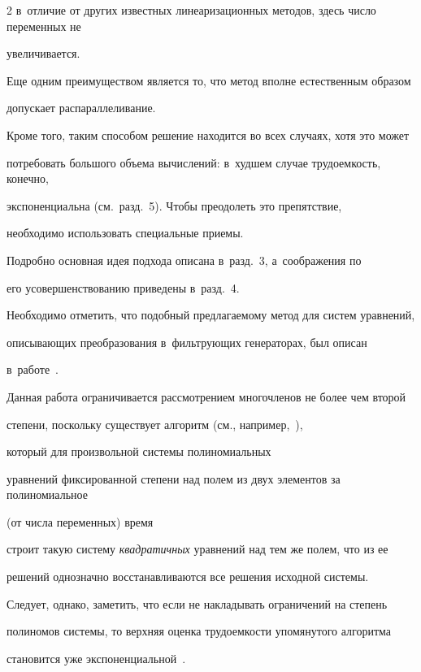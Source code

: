 \begin{multicols}{2}
в~отличие от других известных линеаризационных методов, здесь число переменных не 


увеличивается.


Еще одним преимуществом является то, что метод вполне естественным образом 


допускает распараллеливание.


Кроме того, таким способом решение находится во всех случаях, хотя это может 


потребовать большого объема вычислений: в~худшем случае трудоемкость, конечно, 


экспоненциальна (см.\ разд.~5). Чтобы преодолеть это препятствие, 


необходимо использовать специальные приемы.


Подробно основная идея подхода описана в~разд.~3, а~соображения по 


его усовершенствованию приведены в~разд.~4.


Необходимо отметить, что подобный пред\-ла\-га\-емо\-му метод для систем уравнений, 


описывающих преобразования в~фильтрующих генераторах, был описан 


в~работе~\cite{Log2008}.





Данная работа ограничивается рассмотрением многочленов не более чем второй 


степени, поскольку существует алгоритм (см., например,~\cite[\S{}.2]{Bard2009}), 


который для произвольной системы полиномиальных 


уравнений фиксированной степени над полем из двух элементов за полиномиальное 


(от числа переменных) время


строит такую систему \textit{квадратичных} уравнений над тем же полем, что из ее 


решений однозначно восстанавливаются все решения исходной системы.


Следует, однако, заметить, что если не накладывать ограничений на степень 


полиномов системы, то верхняя оценка трудоемкости упомянутого алгоритма 


становится уже экспоненциальной~\cite[\S{}.6]{Bard2009}. 








\end{multicols}
